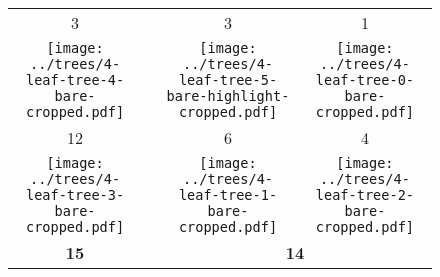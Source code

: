 \documentclass[border=10pt,varwidth=30cm]{standalone}
\newcommand{\pltwidth}{0.1}
\begin{document}
\begin{figure}
    \setlength\arrayrulewidth{2pt}
    \centering
    \begin{tabular}{@{}cccc@{}}
        3 & & 3 & 1 \\
        \texttt{[image: ../trees/4-leaf-tree-4-bare-cropped.pdf]}
        & &
        \texttt{[image: ../trees/4-leaf-tree-5-bare-highlight-cropped.pdf]}
        &
        \texttt{[image: ../trees/4-leaf-tree-0-bare-cropped.pdf]} \\[1ex]
        12 & & 6 & 4 \\
        \texttt{[image: ../trees/4-leaf-tree-3-bare-cropped.pdf]}
        & &
        \texttt{[image: ../trees/4-leaf-tree-1-bare-cropped.pdf]}
        &
        \texttt{[image: ../trees/4-leaf-tree-2-bare-cropped.pdf]} \\
        {\Large \textbf{15}} & & \multicolumn{2}{c}{\Large \textbf{14}} \\
    \end{tabular}
\end{figure}
\end{document}
